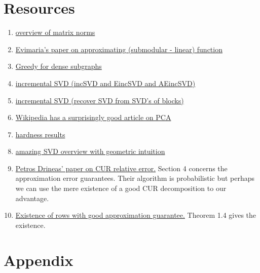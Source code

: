 \documentclass{article}
\begin{document}
\section{Resources}
\begin{enumerate}
    \item \href{https://www.cis.upenn.edu/~cis515/cis515-11-sl4.pdf}{overview of matrix norms} 
    \item \href{https://arxiv.org/pdf/2002.07782.pdf}{Evimaria's paper on approximating (submodular - linear) function} 
    \item \href{https://users.ics.aalto.fi/gionis/greedy-dense.pdf}{Greedy for dense subgraphs}  
    \item \href{https://ieeexplore.ieee.org/stamp/stamp.jsp?tp=&arnumber=8548605}{incremental SVD (incSVD and EincSVD and AEincSVD)}
    \item \href{https://arxiv.org/pdf/1601.07010.pdf}{incremental SVD (recover SVD from SVD's of blocks)}
    \item \href{https://en.wikipedia.org/wiki/Principal_component_analysis#Iterative_computation}{Wikipedia has a surprisingly good article on PCA}
    \item \href{https://www.semanticscholar.org/paper/The-intractability-of-computing-the-minimum-of-a-Vardy/2e0b89803e126a41e872f1d68eeb3e8eb71698c5}{hardness results}
    \item \href{https://www.cs.cmu.edu/~venkatg/teaching/CStheory-infoage/book-chapter-4.pdf}{amazing SVD overview with geometric intuition}
    \item \href{https://www.cs.purdue.edu/homes/pdrineas/documents/publications/Drineas_SIMAX_08b.pdf}{Petros Drineas' paper on CUR relative error.} Section 4 concerns the approximation error guarantees. Their algorithm is probabilistic but perhaps we can use the mere existence of a good CUR decomposition to our advantage.
    \item \href{https://www.theoryofcomputing.org/articles/v002a012/v002a012.pdf}{Existence of rows with good approximation guarantee.} Theorem 1.4 gives the existence.
\end{enumerate}

\printbibliography

\section{Appendix}
\end{document}
